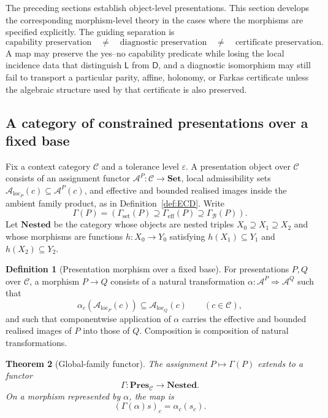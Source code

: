 \documentclass[11pt]{article}
\theoremstyle{plain}
\newtheorem{theorem}{Theorem}[section]
\theoremstyle{definition}
\newtheorem{definition}[theorem]{Definition}
\theoremstyle{remark}
\newcommand{\LocalAdm}{\mathcal{A}_{\mathrm{loc}}}
\newcommand{\eps}{\varepsilon}
\begin{document}
The preceding sections establish object-level presentations. This section develops
the corresponding morphism-level theory in the cases where the morphisms are
specified explicitly. The guiding separation is
\[
\text{capability preservation}
\quad\neq\quad
\text{diagnostic preservation}
\quad\neq\quad
\text{certificate preservation}.
\]
A map may preserve the yes--no capability predicate while losing the local
incidence data that distinguish $\mathsf L$ from $\mathsf D$, and a diagnostic
isomorphism may still fail to transport a particular parity, affine, holonomy, or
Farkas certificate unless the algebraic structure used by that certificate is
also preserved.

\subsection{A category of constrained presentations over a fixed base}

Fix a context category $\mathcal C$ and a tolerance level $\eps$. A presentation
object over $\mathcal C$ consists of an assignment functor
$\mathcal A^P:\mathcal C\to\mathbf{Set}$, local admissibility sets
$\LocalAdm_P(c)\subseteq\mathcal A^P(c)$, and effective and bounded realised
images inside the ambient family product, as in Definition~\ref{def:ECD}. Write
\[
\Gamma(P)=
\left(
\Gamma_{\mathrm{set}}(P)
\supseteq
\Gamma_{\mathrm{eff}}(P)
\supseteq
\Gamma_{\mathcal B}(P)
\right).
\]
Let $\mathbf{Nested}$ be the category whose objects are nested triples
$X_0\supseteq X_1\supseteq X_2$ and whose morphisms are functions
$h:X_0\to Y_0$ satisfying $h(X_1)\subseteq Y_1$ and
$h(X_2)\subseteq Y_2$.

\begin{definition}[Presentation morphism over a fixed base]
\label{def:presentation-morphism-fixed-base}
For presentations $P,Q$ over $\mathcal C$, a morphism $P\to Q$ consists of a
natural transformation $\alpha:\mathcal A^P\Rightarrow\mathcal A^Q$ such that
\[
\alpha_c(\LocalAdm_P(c))\subseteq\LocalAdm_Q(c)
\qquad(c\in\mathcal C),
\]
and such that componentwise application of $\alpha$ carries the effective and
bounded realised images of $P$ into those of $Q$. Composition is composition of
natural transformations.
\end{definition}

\begin{theorem}[Global-family functor]
\label{thm:global-family-functor-monograph}
The assignment $P\mapsto\Gamma(P)$ extends to a functor
\[
\Gamma:\mathbf{Pres}_{\mathcal C}\longrightarrow\mathbf{Nested}.
\]
On a morphism represented by $\alpha$, the map is
\[
(\Gamma(\alpha)s)_c=\alpha_c(s_c).
\]
\end{theorem}
\end{document}
